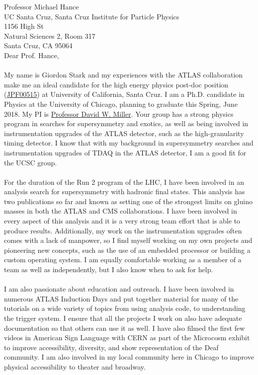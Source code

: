 \documentclass[11pt,letter]{article}
\begin{document}
\thispagestyle{fancy}

Professor Michael Hance \\
UC Santa Cruz, Santa Cruz Institute for Particle Physics \\
1156 High St \\
Natural Sciences 2, Room 317 \\
Santa Cruz, CA 95064 \\[0.5cm]

Dear Prof. Hance, \\
\\
My name is Giordon Stark and my experiences with the ATLAS collaboration make me an ideal candidate for the high energy physics post-doc position (\href{https://recruit.ucsc.edu/apply/JPF00515}{JPF00515}) at University of California, Santa Cruz. I am a Ph.D. candidate in Physics at the University of Chicago, planning to graduate this Spring, June 2018. My PI is \href{http://hep.uchicago.edu/~DavidMiller/Welcome.html}{Professor David W. Miller}. Your group has a strong physics program in searches for supersymmetry and exotics, as well as being involved in instrumentation upgrades of the ATLAS detector, such as the high-granularity timing detector. I know that with my background in supersymmetry searches and instrumentation upgrades of TDAQ in the ATLAS detector, I am a good fit for the UCSC group.\\
\\
For the duration of the Run 2 program of the LHC, I have been involved in an analysis search for supersymmetry with hadronic final states. This analysis has two publications so far and known as setting one of the strongest limits on gluino masses in both the ATLAS and CMS collaborations. I have been involved in every aspect of this analysis and it is a very strong team effort that is able to produce results. Additionally, my work on the instrumentation upgrades often comes with a lack of manpower, so I find myself working on my own projects and pioneering new concepts, such as the use of an embedded processor or building a custom operating system. I am equally comfortable working as a member of a team as well as independently, but I also know when to ask for help.\\
\\
I am also passionate about education and outreach. I have been involved in numerous ATLAS Induction Days and put together material for many of the tutorials on a wide variety of topics from using analysis code, to understanding the trigger system. I ensure that all the projects I work on also have adequate documentation so that others can use it as well. I have also filmed the first few videos in American Sign Language with CERN as part of the Microcosm exhibit to improve accessibility, diversity, and show representation of the Deaf community. I am also involved in my local community here in Chicago to improve physical accessibility to theater and broadway. \\
\end{document}
